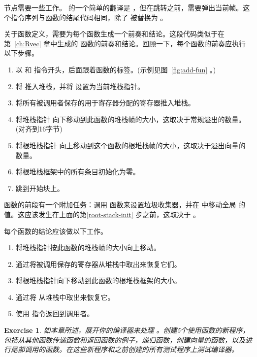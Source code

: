 \documentclass[11pt]{book}
\newtheorem{exercise}[theorem]{Exercise}
\begin{document}
  节点需要一些工作。  的一个简单的翻译是  ，但在跳转之前，需要弹出当前帧。这个指令序列与函数的结尾代码相同，除了  被替换为  。

关于函数定义，需要为每个函数生成一个前奏和结论。这段代码类似于在第~\ref{ch:Rvec} 章中生成的  函数的前奏和结论。回顾一下，每个函数的前奏应执行以下步骤。
\begin{enumerate}
\item 以  和  指令开头，后面跟着函数的标签。(示例见图~\ref{fig:add-fun} 。)
\item 将  推入堆栈，并将  设置为当前堆栈指针。
\item 将所有被调用者保存的用于寄存器分配的寄存器推入堆栈。
\item 将堆栈指针  向下移动到此函数的堆栈帧的大小，这取决于常规溢出的数量。(对齐到16字节)
\item 将根堆栈指针  向上移动到这个函数的根堆栈帧的大小，这取决于溢出向量的数量。 \label{root-stack-init}
\item 将根堆栈框架中的所有条目初始化为零。
\item 跳到开始块上。
\end{enumerate}
  函数的前段有一个附加任务：调用  函数来设置垃圾收集器，并在 中移动全局  的值。这应该发生在上面的第\ref{root-stack-init}
步之前，这取决于  。

每个函数的结论应该做以下工作。
\begin{enumerate}
\item 将堆栈指针按此函数的堆栈帧的大小向上移动。
\item 通过将被调用保存的寄存器从堆栈中取出来恢复它们。
\item 将根堆栈指针向下移动到此函数的根堆栈框架的大小。
\item 通过将  从堆栈中取出来恢复它。
\item 使用  指令返回到调用者。
\end{enumerate}


\begin{exercise}\normalfont
如本章所述，展开你的编译器来处理 \LangFun{} 。创建5个使用函数的新程序，包括从其他函数传递函数和返回函数的例子，递归函数，创建向量的函数，以及进行尾部调用的函数。在这些新程序和之前创建的所有测试程序上测试编译器。
\end{exercise}
\end{document}
